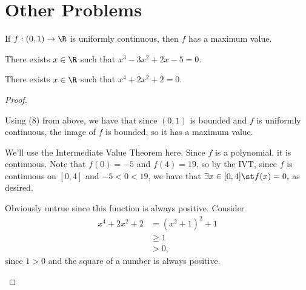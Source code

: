 \documentclass{assignment}
\begin{document}
\section*{Other Problems}
\begin{question}[1]
\begin{qparts}
  \item If $f: (0,1) \to \R$ is uniformly continuous, then $f$ has a maximum value.
  \item There exists $x\in\R$ such that $x^3 - 3x^2 + 2x - 5 = 0.$
  \item There exists $x\in\R$ such that $x^4 + 2x^2 + 2 = 0.$
\end{qparts}  
\end{question}
\begin{proof}\leavevmode
\begin{qparts}
  \item Using (8) from above, we have that since $(0,1)$ is bounded and $f$ is uniformly continuous, 
the image of $f$ is bounded, so it has a maximum value. 
  \item We'll use the Intermediate Value Theorem here. Since $f$ is a polynomial, it is continuous. 
Note that $f(0) = -5$ and $f(4) = 19$, so by the IVT, since $f$ is continuous on $[0, 4]$ and $-5 < 
0 < 19$, we have that $\exists x \in [0,4] \st f(x) = 0,$ as desired.
  \item Obviously untrue since this function is always positive. Consider
\begin{align*}
  x^4 + 2x^2 + 2 &= \left( x^2 + 1 \right)^2 + 1 \\
                 &\geq 1 \\
                 &> 0,
\end{align*}
since $1 > 0$ and the square of a number is always positive.
\end{qparts} 
\end{proof}
\end{document}
